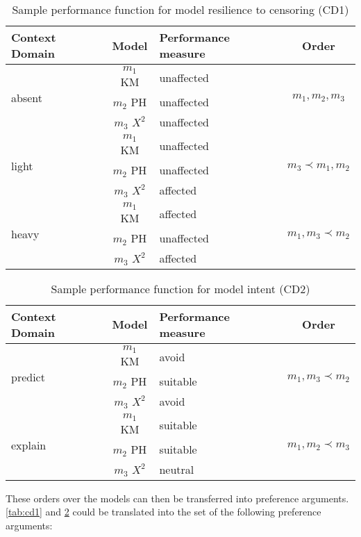 \begin{table}[t]
	\centering
	\begin{tabular}{|l|c|l|c|}
	\hline
	Context Domain 			& Model 			& Performance measure & Order\\
	\hline\hline
	\multirow{3}{*}{absent} & $m_1$ KM 		& unaffected		& 	\multirow{3}{*}{$m_1, m_2, m_3$}\\
							& $m_2$ PH		& unaffected		&\\
							& $m_3$ $X^2$	& unaffected		&\\
	\hline
	\multirow{3}{*}{light} 	& $m_1$ KM 		& unaffected		& \multirow{3}{*}{$m_3 \prec m_1, m_2$}\\
							& $m_2$ PH		& unaffected		&\\
							& $m_3$ $X^2$	& affected		&\\
	\hline
	\multirow{3}{*}{heavy} 	& $m_1$ KM 		& affected		& \multirow{3}{*}{$m_1, m_3 \prec m_2$}\\
							& $m_2$ PH		& unaffected		&\\
							& $m_3$ $X^2$	& affected		&\\
	\hline
	\end{tabular}
	\caption{Sample performance function for model resilience to censoring (CD1) \cite{sassoon2016CD}}
	\label{tab:cd1}
\end{table}


\begin{table}[b]
	\centering
	\begin{tabular}{|l|c|l|c|}
	\hline
	Context Domain 			& Model 			& Performance measure & Order\\
	\hline\hline
	\multirow{3}{*}{predict}& $m_1$ KM 		& avoid		& \multirow{3}{*}{$m_1, m_3 \prec m_2$}\\
							& $m_2$ PH		& suitable	&\\
							& $m_3$ $X^2$	& avoid		&\\
	\hline
	\multirow{3}{*}{explain}& $m_1$ KM 		& suitable	& \multirow{3}{*}{$m_1, m_2 \prec m_3$}\\
							& $m_2$ PH		& suitable	&\\
							& $m_3$ $X^2$	& neutral	&\\
	\hline
	\end{tabular}
	\caption{Sample performance function for model intent (CD2) \cite{sassoon2016CD}}
	\label{tab:cd2}
\end{table}
These orders over the models can then be transferred into preference arguments. \autoref{tab:cd1} and \ref{tab:cd2} could be translated into the set of the following preference arguments:

